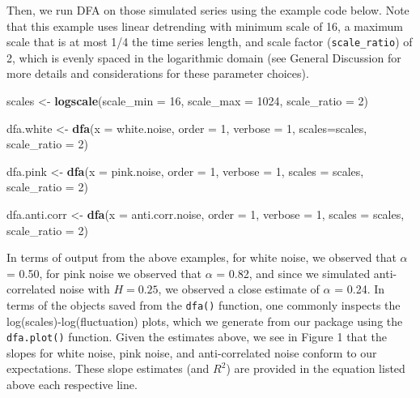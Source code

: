 \documentclass[
  man]{apa6}
\newenvironment{Shaded}{\begin{snugshade}}{\end{snugshade}}
\newcommand{\AttributeTok}[1]{\textcolor[rgb]{0.13,0.29,0.53}{#1}}
\newcommand{\DecValTok}[1]{\textcolor[rgb]{0.00,0.00,0.81}{#1}}
\newcommand{\FunctionTok}[1]{\textcolor[rgb]{0.13,0.29,0.53}{\textbf{#1}}}
\newcommand{\NormalTok}[1]{#1}
\newcommand{\OtherTok}[1]{\textcolor[rgb]{0.56,0.35,0.01}{#1}}
\begin{document}
Then, we run DFA on those simulated series using the example code below.
Note that this example uses linear detrending with minimum scale of 16,
a maximum scale that is at most 1/4 the time series length, and scale
factor (\texttt{scale\_ratio}) of 2, which is evenly spaced in the logarithmic
domain (see General Discussion for more details and considerations for
these parameter choices).

\begin{Shaded}
\begin{Highlighting}[]
\NormalTok{scales }\OtherTok{\textless{}{-}} \FunctionTok{logscale}\NormalTok{(}\AttributeTok{scale\_min =} \DecValTok{16}\NormalTok{, }\AttributeTok{scale\_max =} \DecValTok{1024}\NormalTok{, }\AttributeTok{scale\_ratio =} \DecValTok{2}\NormalTok{)}

\NormalTok{dfa.white }\OtherTok{\textless{}{-}} \FunctionTok{dfa}\NormalTok{(}\AttributeTok{x =}\NormalTok{ white.noise, }\AttributeTok{order =} \DecValTok{1}\NormalTok{, }\AttributeTok{verbose =} \DecValTok{1}\NormalTok{, }
\AttributeTok{scales=}\NormalTok{scales, }\AttributeTok{scale\_ratio =} \DecValTok{2}\NormalTok{)}

\NormalTok{dfa.pink }\OtherTok{\textless{}{-}} \FunctionTok{dfa}\NormalTok{(}\AttributeTok{x =}\NormalTok{ pink.noise, }\AttributeTok{order =} \DecValTok{1}\NormalTok{, }\AttributeTok{verbose =} \DecValTok{1}\NormalTok{,}
\AttributeTok{scales =}\NormalTok{ scales, }\AttributeTok{scale\_ratio =} \DecValTok{2}\NormalTok{)}

\NormalTok{dfa.anti.corr }\OtherTok{\textless{}{-}} \FunctionTok{dfa}\NormalTok{(}\AttributeTok{x =}\NormalTok{ anti.corr.noise, }\AttributeTok{order =} \DecValTok{1}\NormalTok{, }\AttributeTok{verbose =} \DecValTok{1}\NormalTok{, }
\AttributeTok{scales =}\NormalTok{ scales, }\AttributeTok{scale\_ratio =} \DecValTok{2}\NormalTok{)}
\end{Highlighting}
\end{Shaded}

In terms of output from the above examples, for white noise, we observed
that \(\alpha\) = 0.50, for pink noise we observed that
\(\alpha\) = 0.82, and since we simulated anti-correlated
noise with \(H = 0.25\), we observed a close estimate of \(\alpha\) =
0.24. In terms of the objects saved from the \texttt{dfa()}
function, one commonly inspects the log(scales)-log(fluctuation) plots,
which we generate from our package using the \texttt{dfa.plot()} function.
Given the estimates above, we see in Figure 1 that the slopes for white
noise, pink noise, and anti-correlated noise conform to our
expectations. These slope estimates (and \(R^2\)) are provided in the
equation listed above each respective line.
\end{document}
